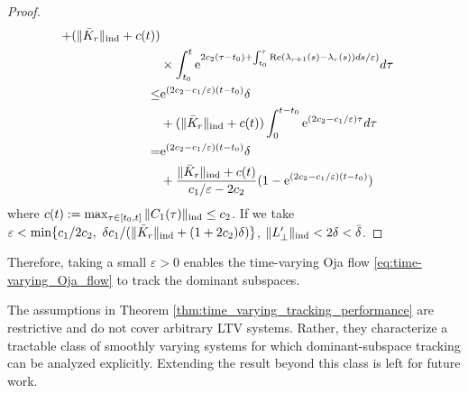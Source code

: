 \documentclass[fleqn,10pt]{SICE_FES26}
\begin{document}
\begin{proof}
\begin{align*}
	+ ( \| \bar{K}_{r} \| _{\rm ind} + c(t) ) 
	\\ & \times 
	 \int _{t_{0}}^{t} {\mathrm{e}}^{2c_{2}(\tau -t_{0}) + \int _{t_{0}}^{\tau } {\mathrm{Re}}( \lambda _{r+1}(s ) - \lambda _{r}(s ) )ds  / \varepsilon) }
	d\tau
	\\
	\leq &
	 {\mathrm{e}}^{(2c_{2} - c_{1} / \varepsilon )(t-t_{0})  } \delta 
	\\ &
	+ ( \| \bar{K}_{r} \| _{\rm ind} + c(t) ) 
	 \int _{0}^{t - t_{0}} {\mathrm{e}}^{( 2c_{2} - c_{1}/\varepsilon ) \tau   } d\tau 
	 \\
	 =&
	 {\mathrm{e}}^{(2c_{2} - c_{1} / \varepsilon )(t-t_{0})  } \delta 
	\\ &
	+ \frac{\| \bar{K}_{r} \| _{\rm ind} + c(t)  }{c_{1}/\varepsilon - 2c_{2}}
	(1 - {\mathrm{e}}^{(2c_{2} - c_{1} / \varepsilon )(t-t_{0})  })
	\end{align*}
	where $c(t) := \max _{\tau \in [t_{0} ,t ]} \| C_{1} (\tau ) \|_{\rm ind} \leq c_2$.  
	If we take $\varepsilon < \min \{ c_{1}/2c_{2} , \ \delta c_{1} / ( \| \bar{K}_{r} \| _{\rm ind} + (1+2c_{2}) \delta ) \} $, $\| L_{\perp}^{\prime} \| _{\rm ind} < 2\delta < \bar{\delta}$. 
	\end{proof}
	
	Therefore, taking a small $\varepsilon >0$ enables the time-varying Oja flow \eqref{eq:time-varying_Oja_flow} to track the dominant subspaces.   
	
	The assumptions in Theorem \ref{thm:time_varying_tracking_performance} are restrictive and do not cover arbitrary LTV systems. Rather, they characterize a tractable class of smoothly varying systems for which dominant-subspace tracking can be analyzed explicitly. Extending the result beyond this class is left for future work.
	
\end{document}
